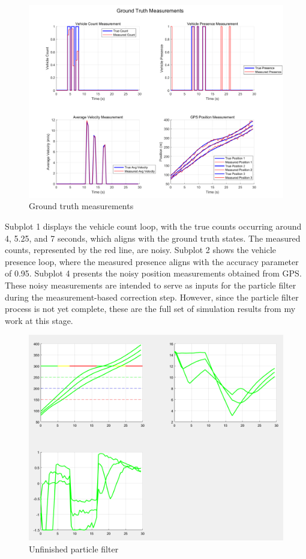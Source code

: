 \begin{figure}[H]
    \centering
    \includegraphics[width= 1\linewidth]{figures/groundtruth measurement.png}
    \caption{Ground truth measurements}
    \label{fig: Ground truth measurements}
\end{figure}

Subplot 1 displays the vehicle count loop, with the true counts occurring around 4, 5.25, and 7 seconds, which aligns with the ground truth states. The measured counts, represented by the red line, are noisy. Subplot 2 shows the vehicle presence loop, where the measured presence aligns with the accuracy parameter of 0.95. Subplot 4 presents the noisy position measurements obtained from GPS. These noisy measurements are intended to serve as inputs for the particle filter during the measurement-based correction step. However, since the particle filter process is not yet complete, these are the full set of simulation results from my work at this stage.

\begin{figure}[H]
    \centering
    \includegraphics[width= 1\linewidth]{figures/particle filter.png}
    \caption{Unfinished particle filter}
    \label{fig: particle filter}
\end{figure}

